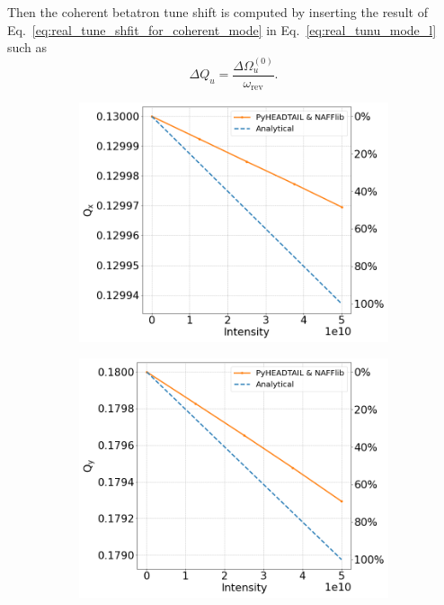 Then the coherent betatron tune shift is computed by inserting the result of Eq.~\eqref{eq:real_tune_shfit_for_coherent_mode} in Eq.~\eqref{eq:real_tunu_mode_l} such as 
\begin{equation}
    \Delta Q_u = \frac{\Delta \Omega_u^{(0)}}{\omega_\mathrm{rev}}.
\end{equation}


\begin{figure}[!ht]
    \centering
    \begin{subfigure}[t]{0.45\textwidth}
        \centering
        \includegraphics[width=1\textwidth]{images/Ch7/Qx_vs_intensity_complete_impedance_sps_q26model_MD2018_parameters.png}
    \end{subfigure}
    \hfill
    \begin{subfigure}[t]{0.45\textwidth}
        \centering
        \includegraphics[width=1\textwidth]{images/Ch7/Qy_vs_intensity_complete_impedance_sps_q26model_MD2018_parameters.png}

\end{subfigure}
\end{figure}
